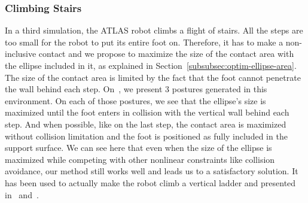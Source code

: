 \subsubsection{Climbing Stairs}
\label{subsubsec:smallStairs}


In a third simulation, the ATLAS robot climbs a flight of stairs.
All the steps are too small for the robot to put its entire foot on.
Therefore, it has to make a non-inclusive contact and we propose to maximize the size of the contact area with the ellipse included in it, as explained in Section~\ref{subsubsec:optim-ellipse-area}.
The size of the contact area is limited by the fact that the foot cannot penetrate the wall behind each step.
On~, we present 3 postures generated in this environment.
On each of those postures, we see that the ellipse's size is maximized until the foot enters in collision with the vertical wall behind each step.
And when possible, like on the last step, the contact area is maximized without collision limitation and the foot is positioned as fully included in the support surface.
We can see here that even when the size of the ellipse is maximized while competing with other nonlinear constraints like collision avoidance, our method still works well and leads us to a satisfactory solution.
It has been used to actually make the robot climb a vertical ladder and presented in~\cite{vaillant:autonomousrobots:2016} and~\cite{vaillant:humanoids:2014}.


